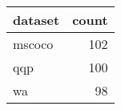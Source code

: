 \begin{tabular}{lr}
\toprule
dataset & count \\
\midrule
mscoco & 102 \\
qqp & 100 \\
wa & 98 \\
\bottomrule
\end{tabular}

